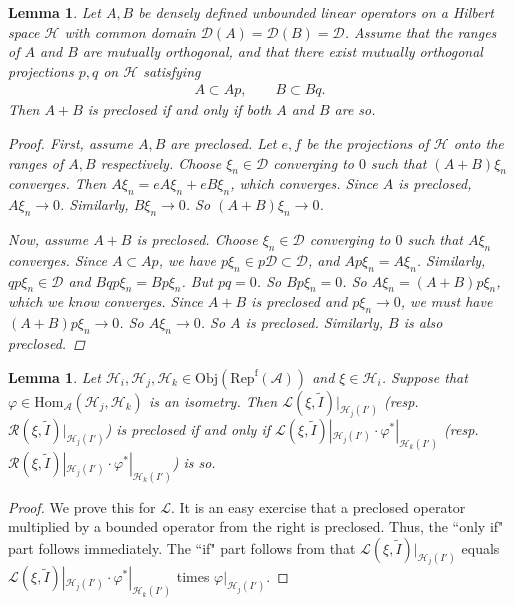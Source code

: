 \documentclass[12pt,a4paper]{article}
\theoremstyle{definition}
\theoremstyle{plain}
\newtheorem{lm}[df]{Lemma}
\newcommand{\mc}{\mathcal}
\newcommand{\wtd}{\widetilde}
\newcommand{\Hom}{\mathrm{Hom}}
\newcommand{\Dom}{\scr D}
\newcommand{\scr}{\mathscr}
\newcommand{\RepfA}{\mathrm{Rep}^{\mathrm f}(\mc A)}
\newcommand{\Obj}{\mathrm{Obj}}
\numberwithin{equation}{section}
\begin{document}
\begin{lm}\label{lb37}
Let $A,B$ be densely defined unbounded linear operators on a Hilbert space $\mc H$ with common domain $\Dom(A)=\Dom(B)=\Dom$. Assume that  the ranges of $A$ and $B$ are mutually orthogonal, and that there exist mutually orthogonal projections $p,q$ on $\mc H$ satisfying
\begin{align*}
A\subset Ap,\qquad 	B\subset Bq.
\end{align*}
Then $A+B$ is preclosed if and only if both $A$ and $B$ are so.

\begin{proof}
First, assume $A,B$ are preclosed. Let $e,f$ be the projections of $\mc H$ onto the ranges of $A,B$ respectively. Choose $\xi_n\in\Dom$ converging to $0$ such that $(A+B)\xi_n$ converges. Then $A\xi_n=eA\xi_n+eB\xi_n$, which converges. Since $A$ is preclosed, $A\xi_n\rightarrow 0$. Similarly, $B\xi_n\rightarrow 0$. So $(A+B)\xi_n\rightarrow 0$.

Now, assume $A+B$ is preclosed. Choose $\xi_n\in\scr D$ converging to $0$ such that $A\xi_n$ converges. Since $A\subset Ap$, we have $p\xi_n\in p\Dom\subset\Dom$, and $Ap\xi_n=A\xi_n$. Similarly, $qp\xi_n\in\Dom$ and $Bqp\xi_n=Bp\xi_n$. But $pq=0$. So $Bp\xi_n=0$. So $A\xi_n=(A+B)p\xi_n$, which we know converges. Since $A+B$ is preclosed and $p\xi_n\rightarrow 0$, we must have $(A+B)p\xi_n\rightarrow 0$. So $A\xi_n\rightarrow 0$. So $A$ is preclosed. Similarly, $B$ is also preclosed.
\end{proof}
 
\end{lm}


\begin{lm}\label{lb38}
Let $\mc H_i,\mc H_j,\mc H_k\in\Obj(\RepfA)$ and $\xi\in\mc H_i$. Suppose that $\varphi\in\Hom_{\mc A}(\mc H_j,\mc H_k)$ is an isometry. Then $\scr L(\xi,\wtd I)|_{\mc H_j(I')}$ (resp. $\scr R(\xi,\wtd I)|_{\mc H_j(I')}$) is preclosed if and only if $\scr L(\xi,\wtd I)|_{\mc H_j(I')}\cdot \varphi^*|_{\mc H_k(I')}$ (resp.  $\scr R(\xi,\wtd I)|_{\mc H_j(I')}\cdot \varphi^*|_{\mc H_k(I')}$) is so.
\end{lm}

\begin{proof}
We prove this for $\scr L$. It is an easy exercise that a preclosed operator multiplied by a bounded operator from the right is preclosed. Thus, the ``only if" part follows immediately. The ``if" part follows from that $\scr L(\xi,\wtd I)|_{\mc H_j(I')}$ equals $\scr L(\xi,\wtd I)|_{\mc H_j(I')}\cdot \varphi^*|_{\mc H_k(I')}$ times $\varphi|_{\mc H_j(I')}$.
\end{proof}
\end{document}
